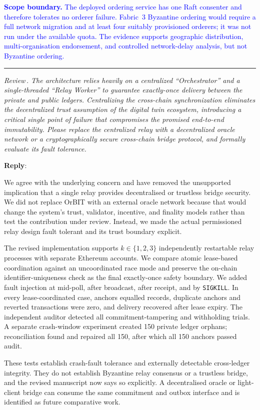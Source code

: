 \documentclass[11pt]{article}
\newcounter{reviewer}
\newcounter{point}[reviewer]
\renewcommand{\thepoint}{Review\,\thereviewer.\arabic{point}}
\newcommand{\point}[1]{\refstepcounter{point}  \bigskip \hrule \medskip \noindent \textit{{\fontseries{b}\selectfont \thepoint } #1}\par}
\newcommand{\reply}{\medskip \noindent \textbf{Reply}:\ }
\begin{document}
\textcolor{blue}{\textbf{Scope boundary.} The deployed ordering service has one Raft consenter and therefore tolerates no orderer failure. Fabric~3 Byzantine ordering would require a full network migration and at least four suitably provisioned orderers; it was not run under the available quota. The evidence supports geographic distribution, multi-organisation endorsement, and controlled network-delay analysis, but not Byzantine ordering.}
\medskip

\point{The architecture relies heavily on a centralized ``Orchestrator'' and a
single-threaded ``Relay Worker'' to guarantee exactly-once delivery between the
private and public ledgers. Centralizing the cross-chain synchronization
eliminates the decentralized trust assumption of the digital twin ecosystem,
introducing a critical single point of failure that compromises the promised
end-to-end immutability. Please replace the centralized relay with a
decentralized oracle network or a cryptographically secure cross-chain bridge
protocol, and formally evaluate its fault tolerance.}

\reply{We agree with the underlying concern and have removed the unsupported
implication that a single relay provides decentralised or trustless bridge
security. We did not replace OrBIT with an external oracle network because that
would change the system's trust, validator, incentive, and finality models rather
than test the contribution under review. Instead, we made the actual permissioned
relay design fault tolerant and its trust boundary explicit.

The revised implementation supports $k\in\{1,2,3\}$ independently restartable
relay processes with separate Ethereum accounts. We compare atomic lease-based
coordination against an uncoordinated race mode and preserve the on-chain
identifier-uniqueness check as the final exactly-once safety boundary. We added
fault injection at mid-poll, after broadcast, after receipt, and by
\texttt{SIGKILL}. In every lease-coordinated case, anchors equalled records,
duplicate anchors and reverted transactions were zero, and delivery recovered
after lease expiry. The independent auditor detected all commitment-tampering
and withholding trials. A separate crash-window experiment created 150 private
ledger orphans; reconciliation found and repaired all 150, after which all 150
anchors passed audit.

These tests establish crash-fault tolerance and externally detectable
cross-ledger integrity. They do not establish Byzantine relay consensus or a
trustless bridge, and the revised manuscript now says so explicitly. A
decentralised oracle or light-client bridge can consume the same commitment and
outbox interface and is identified as future comparative work.}
\end{document}
